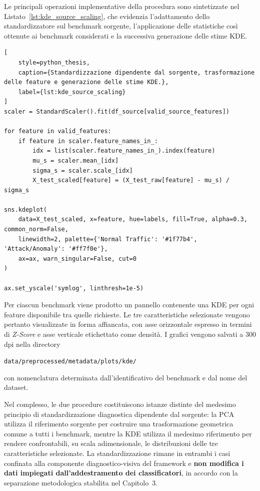 Le principali operazioni implementative della procedura sono sintetizzate nel Listato~\ref{lst:kde_source_scaling}, che evidenzia l'adattamento dello standardizzatore sul benchmark sorgente, l'applicazione delle statistiche così ottenute ai benchmark considerati e la successiva generazione delle stime KDE.

\begin{lstlisting}[
    style=python_thesis,
    caption={Standardizzazione dipendente dal sorgente, trasformazione delle feature e generazione delle stime KDE.},
    label={lst:kde_source_scaling}
]
scaler = StandardScaler().fit(df_source[valid_source_features])

for feature in valid_features:
    if feature in scaler.feature_names_in_:
        idx = list(scaler.feature_names_in_).index(feature)
        mu_s = scaler.mean_[idx]
        sigma_s = scaler.scale_[idx]
        X_test_scaled[feature] = (X_test_raw[feature] - mu_s) / sigma_s

sns.kdeplot(
    data=X_test_scaled, x=feature, hue=labels, fill=True, alpha=0.3, common_norm=False,
    linewidth=2, palette={'Normal Traffic': '#1f77b4', 'Attack/Anomaly': '#ff7f0e'},
    ax=ax, warn_singular=False, cut=0
)

ax.set_yscale('symlog', linthresh=1e-5)
\end{lstlisting}

Per ciascun benchmark viene prodotto un pannello contenente una KDE per ogni feature disponibile tra quelle richieste. 
Le tre caratteristiche selezionate vengono pertanto visualizzate in forma affiancata, con asse orizzontale espresso in termini di \textit{Z-Score} e asse verticale etichettato come densità. 
I grafici vengono salvati a $300$ dpi nella directory 
\begin{center}
    \texttt{data/preprocessed/metadata/plots/kde/}
\end{center}
con nomenclatura determinata dall'identificativo del benchmark e dal nome del dataset.

Nel complesso, le due procedure costituiscono istanze distinte del medesimo principio di standardizzazione diagnostica dipendente dal sorgente: la PCA utilizza il riferimento sorgente per costruire una trasformazione geometrica comune a tutti i benchmark, mentre la KDE utilizza il medesimo riferimento per rendere confrontabili, su scala adimensionale, le distribuzioni delle tre caratteristiche selezionate. 
La standardizzazione rimane in entrambi i casi confinata alla componente diagnostico-visiva del framework e \textbf{non modifica i dati impiegati dall'addestramento dei classificatori}, in accordo con la separazione metodologica stabilita nel Capitolo~3.

